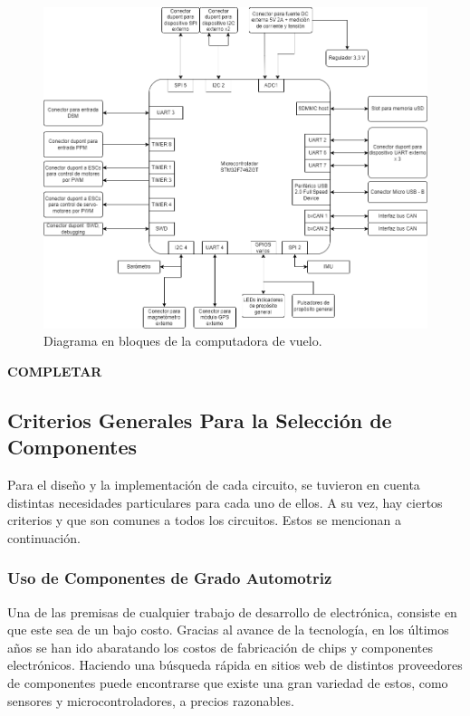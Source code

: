 \begin{figure}[H]
    \centering
    \includegraphics[width=\textwidth]{img/diagrama_en_bloques_computadora_de_vuelo.png}
    \caption{Diagrama en bloques de la computadora de vuelo.}
    \label{fig:diagrama_en_bloques_computadora_de_vuelo}
\end{figure}

\textbf{{\color{red} COMPLETAR}}

\subsection{Criterios Generales Para la Selección de Componentes}


Para el diseño y la implementación de cada circuito, se tuvieron en cuenta distintas necesidades particulares para cada uno de ellos. A su vez, hay ciertos criterios y que son comunes a todos los circuitos. Estos se mencionan a continuación.

\subsubsection{Uso de Componentes de Grado Automotriz}

Una de las premisas de cualquier trabajo de desarrollo de electrónica, consiste en que este sea de un bajo costo. Gracias al avance de la tecnología, en los últimos años se han ido abaratando los costos de fabricación de chips y componentes electrónicos. Haciendo una búsqueda rápida en sitios web de distintos proveedores de componentes puede encontrarse que existe una gran variedad de estos, como sensores y microcontroladores, a precios razonables.

